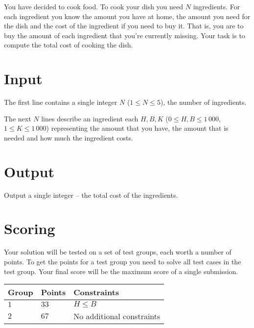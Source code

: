 You have decided to cook food.
To cook your dish you need $N$ ingredients.
For each ingredient you know the amount you have at home, the amount you need for the dish and the cost of the ingredient if you need to buy it.
That is, you are to buy the amount of each ingredient that you're currently missing.
Your task is to compute the total cost of cooking the dish.

\section*{Input}
The first line contains a single integer $N$ ($1 \le N \le 5$), the number of ingredients.

The next $N$ lines describe an ingredient each $H, B, K$ ($0 \le H, B \le 1\,000$, $1 \le K \le 1\,000$) representing the amount that you have, the amount that is needed and how much the ingredient costs.

\section*{Output}
Output a single integer -- the total cost of the ingredients.

\section*{Scoring}
Your solution will be tested on a set of test groups, each worth a number of points.
To get the points for a test group you need to solve all test cases in the test group. Your final score will be the maximum score of a single submission.

\noindent
\begin{tabular}{| l | l | l |}
  \hline
  Group & Points & Constraints \\ \hline
  $1$    & $33$        &  $H \le B$ \\ \hline
  $2$    & $67$        &  No additional constraints \\ \hline
\end{tabular}
